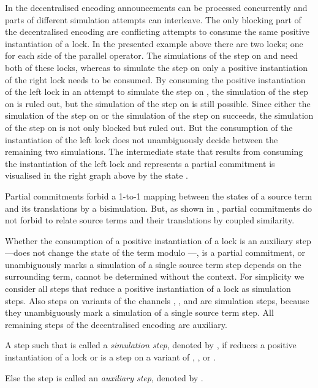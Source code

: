 \documentclass[copyright,creativecommons]{eptcs}
\begin{document}
  In the decentralised encoding announcements can be processed concurrently and parts of different simulation attempts can interleave. The only blocking part of the decentralised encoding are conflicting attempts to consume the same positive instantiation of a lock.
  In the presented example above there are two locks; one for each side of the parallel operator. The simulations of the step on  and  need both of these locks, whereas to simulate the step on  only a positive instantiation of the right lock needs to be consumed.
  By consuming the positive instantiation of the left lock in an attempt to simulate the step on , the simulation of the step on  is ruled out, but the simulation of the step on  is still possible. Since either the simulation of the step on  or the simulation of the step on  succeeds, the simulation of the step on  is not only blocked but ruled out. But the consumption of the instantiation of the left lock does not unambiguously decide between the remaining two simulations. The intermediate state that results from consuming the instantiation of the left lock and represents a partial commitment is visualised in the right graph above by the state .
  
  Partial commitments forbid a 1-to-1 mapping between the states of  a source term and its translations by a bisimulation. But, as shown in \cite{parrowCoupled92}, partial commitments do not forbid to relate source terms and their translations by coupled similarity.

Whether the consumption of a positive instantiation of a lock is an auxiliary step---does not change the state of the term modulo ---, is a partial commitment, or unambiguously marks a simulation of a single source term step depends on the surrounding term, \ie cannot be determined without the context. For simplicity we consider all steps that reduce a positive instantiation of a lock as simulation steps.
Also steps on variants of the channels , , and  are simulation steps, because they unambiguously mark a simulation of a single source term step. All remaining steps of the decentralised encoding are auxiliary.

\begin{definition}
	A step  such that  is called a \emph{simulation step}, denoted by , if  reduces a positive instantiation of a lock or is a step on a variant of , , or .
	
	Else the step  is called an \emph{auxiliary step}, denoted by .
	\label{def:auxStepsDecentral}
\end{definition}
\end{document}
